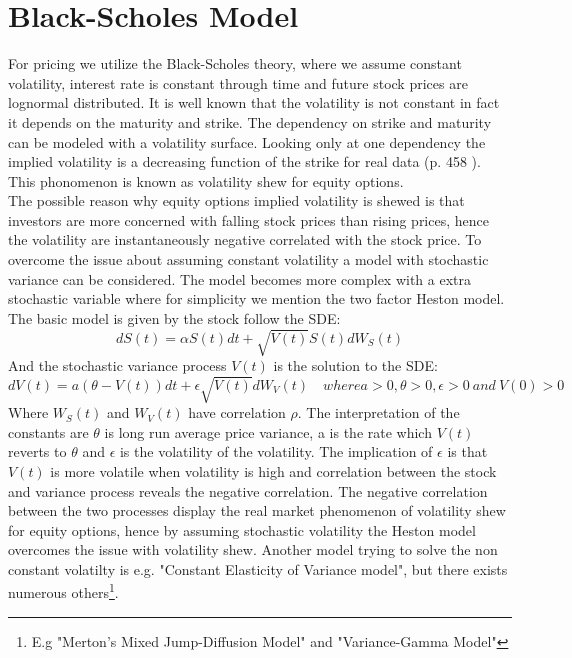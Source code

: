 \section{Black-Scholes Model}
For pricing we utilize the Black-Scholes theory, where we assume constant volatility, interest rate is constant through time and future stock prices are lognormal distributed. It is well known that the volatility is not constant in fact it depends on the maturity and strike. The dependency on strike and maturity can be modeled with a volatility surface. Looking only at one dependency the implied volatility is a decreasing function of the strike for real data (p. 458 \parencite{Hull}). This phonomenon is known as volatility shew for equity options. \\

The possible reason why equity options implied volatility is shewed is that investors are more concerned with falling stock prices than rising prices, hence the volatility are instantaneously negative correlated with the stock price. To overcome the issue about assuming constant volatility a model with stochastic variance can be considered. The model becomes more complex with a extra stochastic variable where for simplicity we mention the two factor Heston model. The basic model is given by the stock follow the SDE:
$$dS(t)=\alpha S(t) dt + \sqrt{V(t)} S(t) dW_S(t)$$
And the stochastic variance process $V(t)$ is the solution to the SDE:
$$dV(t)=a(\theta - V(t))dt + \epsilon \sqrt{V(t)} dW_V(t) \quad where a>0,\theta>0, \epsilon>0 \ and \ V(0)>0$$
Where $W_S(t)$ and $W_V(t)$ have correlation $\rho$. The interpretation of the constants are $\theta$ is long run average price variance, a is the rate which $V(t)$ reverts to $\theta$ and $\epsilon$ is the volatility of the volatility. The implication of $\epsilon$ is that $V(t)$ is more volatile when volatility is high and correlation between the stock and variance process reveals the negative correlation. The negative correlation between the two processes display the real market phenomenon of volatility shew for equity options, hence by assuming stochastic volatility the Heston model overcomes the issue with volatility shew. Another model trying to solve the non constant volatilty is e.g. "Constant Elasticity of Variance model", but there exists numerous others\footnote{E.g "Merton's Mixed Jump-Diffusion Model" and "Variance-Gamma Model"}. \\

